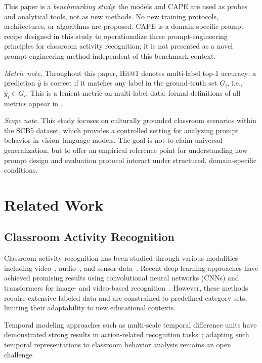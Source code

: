 \documentclass[symmetry,article,submit,pdftex,moreauthors]{Definitions/mdpi}
\begin{document}
\noindent This paper is a \emph{benchmarking study}: the models and CAPE are used as probes and analytical tools, not as new methods. No new training protocols, architectures, or algorithms are proposed. CAPE is a domain-specific prompt recipe designed in this study to operationalize three prompt-engineering principles for classroom activity recognition; it is not presented as a novel prompt-engineering method independent of this benchmark context.

\noindent\textit{Metric note.} Throughout this paper, Hit@1 denotes multi-label top-1 accuracy: a prediction $\hat{y}$ is correct if it matches any label in the ground-truth set $G_i$, i.e., $\hat{y}_i \in G_i$. This is a lenient metric on multi-label data; formal definitions of all metrics appear in .

\noindent\textit{Scope note.} This study focuses on culturally grounded classroom scenarios within the SCB5 dataset, which provides a controlled setting for analyzing prompt behavior in vision--language models. The goal is not to claim universal generalization, but to offer an empirical reference point for understanding how prompt design and evaluation protocol interact under structured, domain-specific conditions.


\section{Related Work}
\label{sec:related}

\subsection{Classroom Activity Recognition}

Classroom activity recognition has been studied through various modalities including video~\cite{whitehill2014automated}, audio~\cite{donnelly2017automatic}, and sensor data~\cite{dillenbourg2011classroom}.
Recent deep learning approaches have achieved promising results using convolutional neural networks (CNNs) and transformers for image- and video-based recognition~\cite{zhang2020classroom_cnn,nguyen2023transformer}.
However, these methods require extensive labeled data and are constrained to predefined category sets, limiting their adaptability to new educational contexts.

Temporal modeling approaches such as multi-scale temporal difference units have demonstrated strong results in action-related recognition tasks~\cite{zhang2026silhouette}; adapting such temporal representations to classroom behavior analysis remains an open challenge.
\end{document}
